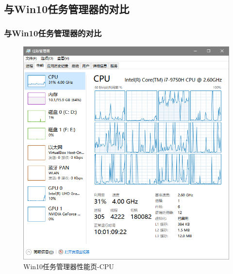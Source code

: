 \documentclass{beamer}
\begin{document}
\subsection{与Win10任务管理器的对比}
\begin{frame}
    \frametitle{与Win10任务管理器的对比}

\begin{figure}
    \centering
    \includegraphics[scale=0.4]{../media/comparison/win10 perftab cpu.png}
    \caption{Win10任务管理器性能页-CPU}
    \label{fig:win10cpu}
\end{figure}
\end{frame}
\end{document}
